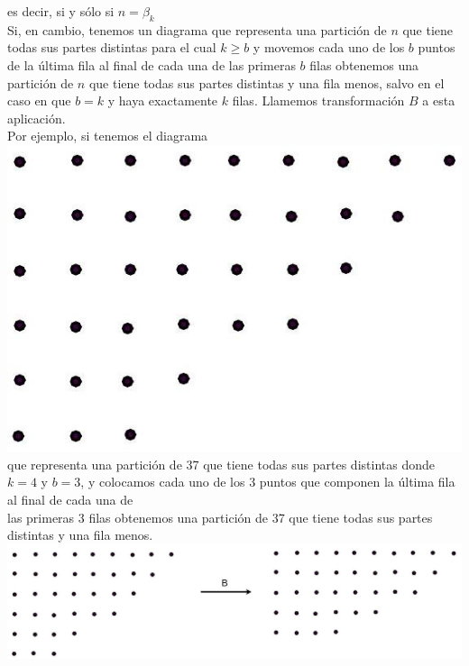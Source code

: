 \documentclass[10pt]{article}
\begin{document}
es decir, si y sólo si $n=\beta_{k}$\\
Si, en cambio, tenemos un diagrama que representa una partición de $n$ que tiene todas sus partes distintas para el cual $k \geq b$ y movemos cada uno de los $b$ puntos de la última fila al final de cada una de las primeras $b$ filas obtenemos una partición de $n$ que tiene todas sus partes distintas y una fila menos, salvo en el caso en que $b=k$ y haya exactamente $k$ filas. Llamemos transformación $B$ a esta aplicación.\\
Por ejemplo, si tenemos el diagrama\\
\includegraphics[max width=\textwidth, center]{2025_09_05_3ba26226ec0baddb5a03g-36}\\
que representa una partición de 37 que tiene todas sus partes distintas donde $k=4$ y $b=3$, y colocamos cada uno de los 3 puntos que componen la última fila al final de cada una de\\
las primeras 3 filas obtenemos una partición de 37 que tiene todas sus partes distintas y una fila menos.\\
\includegraphics[max width=\textwidth, center]{2025_09_05_3ba26226ec0baddb5a03g-37(1)}
\end{document}
